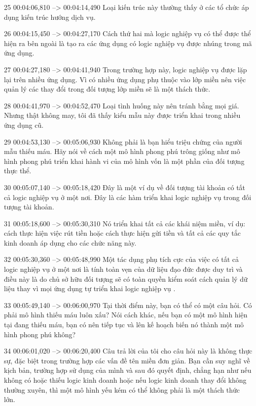 25
00:04:06,810 --> 00:04:14,490
Loại kiến ​​trúc này thường thấy ở các tổ chức áp dụng kiến ​​trúc hướng dịch vụ.

26
00:04:15,450 --> 00:04:27,170
Cách thứ hai mà logic nghiệp vụ có thể được thể hiện ra bên ngoài là tạo ra các ứng dụng có logic nghiệp vụ được nhúng trong mã ứng dụng.

27
00:04:27,180 --> 00:04:41,940
Trong trường hợp này, logic nghiệp vụ được lặp lại trên nhiều ứng dụng.  Vì có nhiều ứng dụng phụ thuộc vào lớp miền nên việc quản lý các thay đổi trong đối tượng lớp miền sẽ là một thách thức.

28
00:04:41,970 --> 00:04:52,470
Loại tình huống này nên tránh bằng mọi giá.  Nhưng thật không may, tôi đã thấy kiểu mẫu này được triển khai trong nhiều ứng dụng cũ.

29
00:04:53,130 --> 00:05:06,930
Không phải là bạn hiểu triệu chứng của người mẫu thiếu máu.  Hãy nói về cách một mô hình phong phú trông giống như mô hình phong phú triển khai hành vi của mô hình vốn là một phần của đối tượng thực thể.

30
00:05:07,140 --> 00:05:18,420
Đây là một ví dụ về đối tượng tài khoản có tất cả logic nghiệp vụ ở một nơi.  Đây là các hàm triển khai logic nghiệp vụ trong đối tượng tài khoản.

31
00:05:18,600 --> 00:05:30,310
Nó triển khai tất cả các khái niệm miền, ví dụ: cách thực hiện việc rút tiền hoặc cách thực hiện gửi tiền và tất cả các quy tắc kinh doanh áp dụng cho các chức năng này.

32
00:05:30,360 --> 00:05:48,990
Một tác dụng phụ tích cực của việc có tất cả logic nghiệp vụ ở một nơi là tính toàn vẹn của dữ liệu đạo đức được duy trì và điều này là do chủ sở hữu đối tượng sẽ có toàn quyền kiểm soát cách quản lý dữ liệu thay vì mọi ứng dụng tự triển khai logic nghiệp vụ  .

33
00:05:49,140 --> 00:06:00,970
Tại thời điểm này, bạn có thể có một câu hỏi.  Có phải mô hình thiếu máu luôn xấu?  Nói cách khác, nếu bạn có một mô hình hiện tại đang thiếu máu, bạn có nên tiếp tục và lên kế hoạch biến nó thành một mô hình phong phú không?

34
00:06:01,020 --> 00:06:20,400
Câu trả lời của tôi cho câu hỏi này là không thực sự, đặc biệt trong trường hợp các vấn đề tên miền đơn giản.  Bạn cần suy nghĩ về kịch bản, trường hợp sử dụng của mình và sau đó quyết định, chẳng hạn như nếu không có hoặc thiếu logic kinh doanh hoặc nếu logic kinh doanh thay đổi không thường xuyên, thì một mô hình yếu kém có thể không phải là một thách thức lớn.

